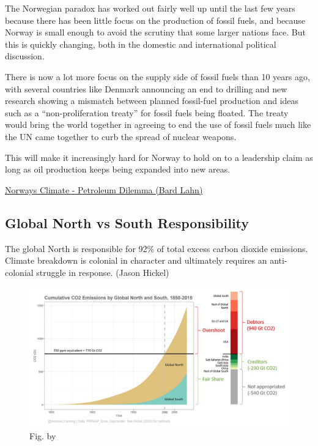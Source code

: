 \documentclass[
]{book}
\begin{document}
The Norwegian paradox has worked out fairly well up until the last few years because there has been little focus on the production of fossil fuels, and because Norway is small enough to avoid the scrutiny that some larger nations face. But this is quickly changing, both in the domestic and international political discussion.

There is now a lot more focus on the supply side of fossil fuels than 10 years ago, with several countries like Denmark announcing an end to drilling and new research showing a mismatch between planned fossil-fuel production and ideas such as a ``non-proliferation treaty'' for fossil fuels being floated. The treaty would bring the world together in agreeing to end the use of fossil fuels much like the UN came together to curb the spread of nuclear weapons.

This will make it increasingly hard for Norway to hold on to a leadership claim as long as oil production keeps being expanded into new areas.

\href{https://www.vox.com/22227063/norway-oil-gas-climate-change}{Norways Climate - Petroleum Dilemma (Bard Lahn)}

\hypertarget{global-north-vs-south-responsibility}{%
\subsection{Global North vs South Responsibility}\label{global-north-vs-south-responsibility}}

The global North is responsible for 92\% of total excess carbon dioxide emissions.
Climate breakdown is colonial in character and ultimately requires an anti-colonial struggle in response. (Jason Hickel)

\begin{figure}
\centering
\includegraphics{fig/CO2_Emissions_Global_North_South.jpeg}
\caption{Fig. by \citet{AndrewFanning}}
\end{figure}
\end{document}
